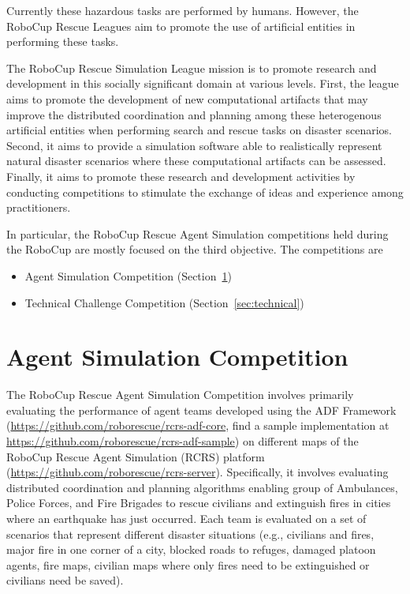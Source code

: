 \documentclass{article}
\begin{document}
Currently these hazardous tasks are performed by humans. However, the RoboCup Rescue Leagues aim to promote the use of artificial entities in performing these tasks.

The RoboCup Rescue Simulation League mission is to promote research and development in this socially significant domain at various levels. First, the league aims to promote the development of new computational artifacts that may improve the distributed coordination and planning among these heterogenous artificial entities when performing search and rescue tasks on disaster scenarios. Second, it aims to provide a simulation software able to realistically represent natural disaster scenarios where these computational artifacts can be assessed. Finally, it aims to promote these research and development activities by conducting competitions to stimulate the exchange of ideas and experience among practitioners.

In particular, the RoboCup Rescue Agent Simulation competitions held during the RoboCup are mostly focused on the third objective. The competitions are
\begin{itemize}
\item Agent Simulation Competition (Section~\ref{sec:agent})
\item Technical Challenge Competition (Section~\ref{sec:technical})
\end{itemize}
\section{Agent Simulation Competition}
\label{sec:agent}
The RoboCup Rescue Agent Simulation Competition involves primarily evaluating the performance of agent teams developed using the ADF Framework (\url{https://github.com/roborescue/rcrs-adf-core}, find a sample implementation at \url{https://github.com/roborescue/rcrs-adf-sample}) on different maps of the RoboCup Rescue Agent Simulation (RCRS) platform (\url{https://github.com/roborescue/rcrs-server}). Specifically, it involves evaluating distributed coordination and planning algorithms enabling group of Ambulances, Police Forces, and Fire Brigades to rescue civilians and extinguish fires in cities where an earthquake has just occurred. Each team is evaluated on a set of scenarios that represent different disaster situations (e.g., civilians and fires, major fire in one corner of a city, blocked roads to refuges, damaged platoon agents, fire maps, civilian maps where only fires need to be extinguished or civilians need be saved).
\end{document}
